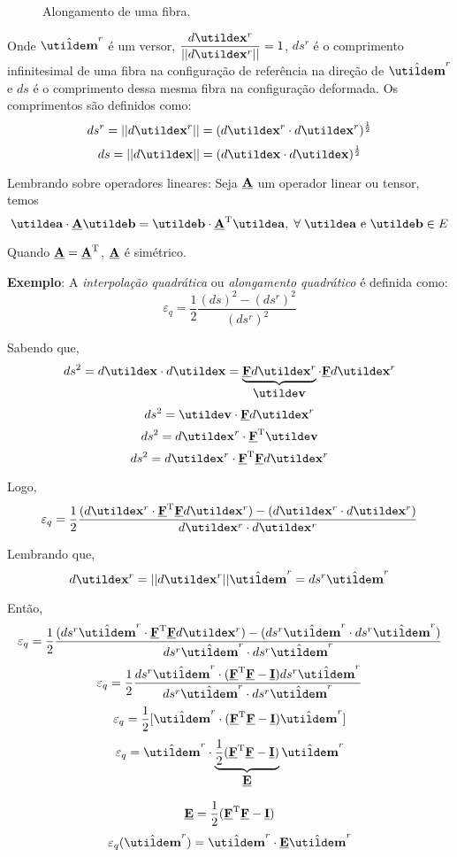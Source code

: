 \begin{figure}[H]
	\centering
	\caption{Alongamento de uma fibra.}
	\vspace*{5mm}
	
\end{figure}
	
Onde $\vth{m}^r$ é um versor, $\displaystyle\frac{d\vt{x}^r}{||d\vt{x}^r||}=1$, $ds^r$ é o comprimento infinitesimal de uma fibra na configuração de referência na direção de $\vth{m}^r$ e $ds$ é o comprimento dessa mesma fibra na configuração deformada. Os comprimentos são definidos como:
\[ds^r=||d\vt{x}^r||=(d\vt{x}^r\cdot d\vt{x}^r)^{\frac{1}{2}}\]
\[ds=||d\vt{x}||=(d\vt{x}\cdot d\vt{x})^{\frac{1}{2}}\]

Lembrando sobre operadores lineares: Seja $\underline{\mathbf{A}}$ um operador linear ou tensor, temos
\[\vt{a}\cdot\ts{A}\vt{b}=\vt{b}\cdot\ts{A}^{\text{T}}\vt{a},\;\forall\;\vt{a}\text{ e }\vt{b}\in\text{$E$}\]

Quando $\underline{\mathbf{A}}=\underline{\mathbf{A}}^{\text{T}}$, $\underline{\mathbf{A}}$ é simétrico.
	
\textbf{Exemplo}: A \textit{interpolação quadrática} ou \textit{alongamento quadrático} é definida como:
\[\varepsilon_q=\frac{1}{2}\frac{(ds)^2-(ds^r)^2}{(ds^r)^2}\]
	
Sabendo que,
\[ds^2=d\vt{x}\cdot d\vt{x}=\underbrace{\ts{F}d\vt{x}^r}_{\displaystyle\vt{v}}\cdot\ts{F}d\vt{x}^r\]
\[ds^2=\vt{v}\cdot\ts{F}d\vt{x}^r\]
\[ds^2=d\vt{x}^r\cdot\ts{F}^{\text{T}}\vt{v}\]
\[ds^2=d\vt{x}^r\cdot\ts{F}^{\text{T}}\ts{F}d\vt{x}^r\]
	
Logo,
\[\varepsilon_q=\frac{1}{2}\frac{(d\vt{x}^r\cdot\ts{F}^{\text{T}}\ts{F}d\vt{x}^r)-(d\vt{x}^r\cdot d\vt{x}^r)}{d\vt{x}^r\cdot d\vt{x}^r}\]
	
Lembrando que,
\[d\vt{x}^r=||d\vt{x}^r||\vth{m}^r=ds^r\vth{m}^r\]

Então,
\[\varepsilon_q=\frac{1}{2}\frac{(ds^r\vth{m}^r\cdot\ts{F}^{\text{T}}\ts{F}d\vt{x}^r)-(ds^r\vth{m}^r\cdot ds^r\vth{m}^r)}{ds^r\vth{m}^r\cdot ds^r\vth{m}^r}\]
\[\varepsilon_q=\frac{1}{2}\frac{ds^r\vth{m}^r\cdot(\ts{F}^{\text{T}}\ts{F}-\ts{I})ds^r\vth{m}^r}{ds^r\vth{m}^r\cdot ds^r\vth{m}^r}\]
\[\varepsilon_q=\frac{1}{2}[\vth{m}^r\cdot(\ts{F}^{\text{T}}\ts{F}-\ts{I})\vth{m}^r]\]
\[\varepsilon_q=\vth{m}^r\cdot\underbrace{\frac{1}{2}(\ts{F}^{\text{T}}\ts{F}-\ts{I})}_{\displaystyle\ts{E}}\vth{m}^r\]

\[\underline{\mathbf{E}}=\frac{1}{2}(\underline{\mathbf{F}}^{\text{T}}\underline{\mathbf{F}}-\underline{\mathbf{I}})\]
\[\varepsilon_q(\vth{m}^r)=\vth{m}^r\cdot\ts{E}\vth{m}^r\]
	
